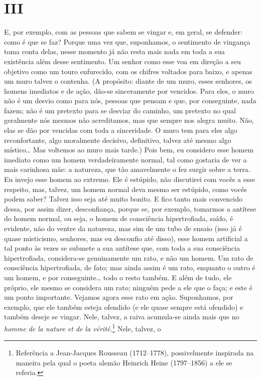 \section{III}

E, por exemplo, com as pessoas que sabem se vingar e, em geral, se defender: como
é que se faz? Porque uma vez que, suponhamos, o sentimento de vingança toma
conta delas, nesse momento já não resta mais nada em toda a sua existência além
desse sentimento. Um senhor como esse voa em direção a seu objetivo como um
touro enfurecido, com os chifres voltados para baixo, e apenas um muro talvez o
contenha. (A propósito: diante de um muro, esses senhores, os homens imediatos
e de ação, dão-se sinceramente por vencidos. Para eles, o muro não é um desvio
como para nós, pessoas que pensam e que, por conseguinte, nada
fazem; não é um pretexto para se desviar do caminho, um pretexto no qual
geralmente nós mesmos não acreditamos, mas que sempre nos alegra muito. Não,
elas se dão por vencidas com toda a sinceridade. O muro tem para eles algo
reconfortante, algo moralmente decisivo, definitivo, talvez até mesmo algo
místico\ldots{} Mas voltemos ao muro mais tarde.) Pois bem, eu considero esse
homem imediato como um homem verdadeiramente normal, tal como gostaria de ver a
mais carinhosa mãe: a natureza, que tão amavelmente o fez surgir sobre a terra.
Eu invejo esse homem ao extremo. Ele é estúpido, não discutirei com vocês a
esse respeito, mas, talvez, um homem normal deva mesmo ser estúpido, como vocês
podem saber? Talvez isso seja até muito bonito. E fico tanto mais convencido
dessa, por assim dizer, desconfiança, porque se, por exemplo, tomarmos a
antítese do homem normal, ou seja, o homem de consciência hipertrofiada, saído,
é evidente, não do ventre da natureza, mas sim de um tubo de ensaio (isso já é
quase misticismo, senhores, mas eu desconfio até disso), esse homem artificial
a tal ponto às vezes se submete a sua antítese que, com toda a sua consciência
hipertrofiada, considera-se genuinamente um rato, e não um homem. Um rato de
consciência hipertrofiada, de fato; mas ainda assim é um rato, enquanto o outro
é um homem, e por conseguinte\ldots{} todo o resto também. E além de tudo, ele
próprio, ele mesmo se considera um rato; ninguém pede a ele que o faça; e este
é um ponto importante. Vejamos agora esse rato em ação. Suponhamos, por
exemplo, que ele também esteja ofendido (e ele quase sempre está ofendido) e
também deseje se vingar.  Nele, talvez, a raiva acumula-se ainda mais que no
\textit{homme de la nature et de la vérité}.\footnote{ Referência a
Jean-Jacques Rousseau (1712--1778), possivelmente inspirada na maneira pela qual
o poeta alemão Heinrich Heine (1797--1856) a ele se referia.} Nele, talvez, o
